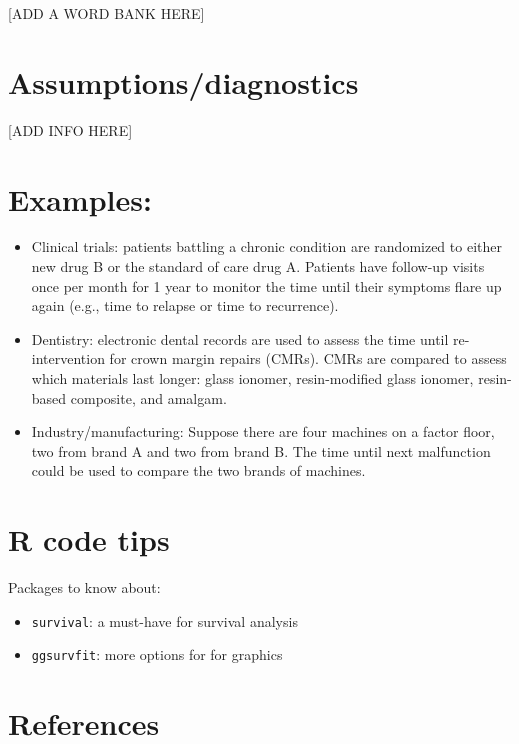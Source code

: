 \documentclass[
]{book}
\providecommand{\tightlist}{%
  \setlength{\itemsep}{0pt}\setlength{\parskip}{0pt}}
\begin{document}
{[}ADD A WORD BANK HERE{]}

\hypertarget{assumptionsdiagnostics}{%
\section{Assumptions/diagnostics}\label{assumptionsdiagnostics}}

{[}ADD INFO HERE{]}

\hypertarget{examples}{%
\section{Examples:}\label{examples}}

\begin{itemize}
\item
  Clinical trials: patients battling a chronic condition are randomized to either new drug B or the standard of care drug A. Patients have follow-up visits once per month for 1 year to monitor the time until their symptoms flare up again (e.g., time to relapse or time to recurrence).
\item
  Dentistry: electronic dental records are used to assess the time until re-intervention for crown margin repairs (CMRs). CMRs are compared to assess which materials last longer: glass ionomer, resin-modified glass ionomer, resin-based composite, and amalgam.
\item
  Industry/manufacturing: Suppose there are four machines on a factor floor, two from brand A and two from brand B. The time until next malfunction could be used to compare the two brands of machines.
\end{itemize}

\hypertarget{r-code-tips}{%
\section{R code tips}\label{r-code-tips}}

Packages to know about:

\begin{itemize}
\tightlist
\item
  \texttt{survival}: a must-have for survival analysis
\item
  \texttt{ggsurvfit}: more options for for graphics
\end{itemize}

\hypertarget{references}{%
\section{References}\label{references}}
\end{document}
